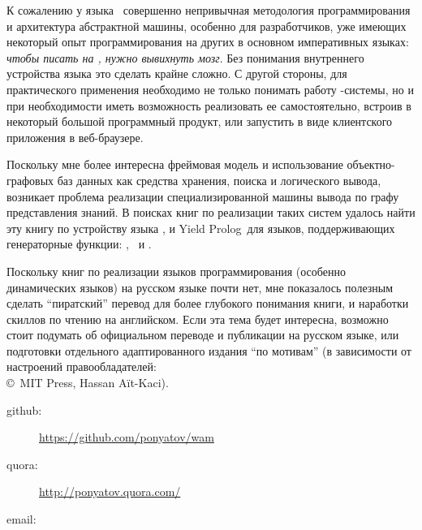 К сожалению у языка \prolog\ совершенно непривычная методология программирования
и архитектура абстрактной машины, особенно для разработчиков, уже имеющих
некоторый опыт программирования на других в основном императивных языках:
\emph{чтобы писать на \prolog, нужно вывихнуть мозг}. Без понимания внутреннего
устройства языка это сделать крайне сложно.
С другой стороны, для практического применения необходимо не только понимать
работу \prolog-системы, но и при необходимости иметь возможность реализовать ее
самостоятельно, встроив в некоторый большой программный продукт, или запустить в
виде клиентского приложения в веб-браузере.

Поскольку мне более интересна фреймовая модель\cite{minsky} и использование
объектно-графовых баз данных как средства хранения, поиска и логического вывода,
возникает проблема реализации специализированной машины вывода по графу
представления знаний. В поисках книг по реализации таких систем удалось
найти эту книгу по устройству языка \prolog, и Yield
Prolog\ для языков,
поддерживающих генераторные функции: \py, \js\ и \csharp.

Поскольку книг по реализации языков программирования (особенно динамических
языков) на русском языке почти нет\cite{dragon,plai}, мне показалось полезным
сделать ``пиратский'' перевод для более глубокого понимания книги, и наработки
скиллов по чтению на английском. Если эта тема будет интересна, возможно стоит
подумать об официальном переводе и публикации на русском языке, или подготовки
отдельного адаптированного издания ``по мотивам'' (в зависимости от настроений
правообладателей:\\\copyright\ MIT Press, Hassan A\"it-Kaci).

\bigskip
\begin{description}
\item[github:] \url{https://github.com/ponyatov/wam}
\item[quora:] \url{http://ponyatov.quora.com/}
\item[email:] 
\end{description}
 